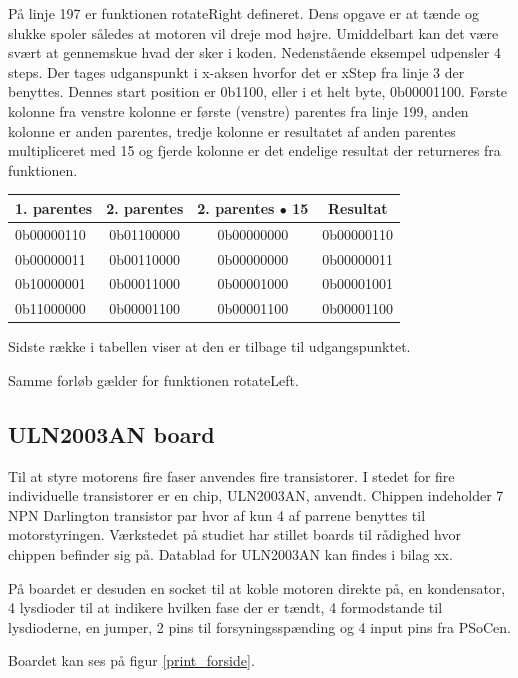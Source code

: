 På linje 197 er funktionen rotateRight defineret. Dens opgave er at tænde og slukke spoler således at motoren vil dreje mod højre. Umiddelbart kan det være svært at gennemskue hvad der sker i koden. Nedenstående eksempel udpensler 4 steps. Der tages udganspunkt i x-aksen hvorfor det er xStep fra linje 3 der benyttes. Dennes start position er 0b1100, eller i et helt byte, 0b00001100. Første kolonne fra venstre kolonne er første (venstre) parentes fra linje 199, anden kolonne er anden parentes, tredje kolonne er resultatet af anden parentes multipliceret med 15 og fjerde kolonne er det endelige resultat der returneres fra funktionen.

\begin{table}
\begin{tabular}{| l | c | c | c |}
\hline
1. parentes & 2. parentes & 2. parentes $\bullet$ 15 & Resultat\\\hline
0b00000110 & 0b01100000 & 0b00000000 & 0b00000110\\\hline
0b00000011 & 0b00110000 & 0b00000000 & 0b00000011\\\hline
0b10000001 & 0b00011000 & 0b00001000 & 0b00001001\\\hline
0b11000000 & 0b00001100 & 0b00001100 & 0b00001100\\\hline
\end{tabular}
\end{table}

Sidste række i tabellen viser at den er tilbage til udgangspunktet.

Samme forløb gælder for funktionen rotateLeft.

\subsection{ULN2003AN board}
Til at styre motorens fire faser anvendes fire transistorer. I stedet for fire individuelle transistorer er en chip, ULN2003AN, anvendt. Chippen indeholder 7 NPN Darlington transistor par hvor af kun 4 af parrene benyttes til motorstyringen. Værkstedet på studiet har stillet boards til rådighed hvor chippen befinder sig på. Datablad for ULN2003AN kan findes i bilag xx.

På boardet er desuden en socket til at koble motoren direkte på, en kondensator, 4 lysdioder til at indikere hvilken fase der er tændt, 4 formodstande til lysdioderne, en jumper, 2 pins til forsyningsspænding og 4 input pins fra PSoCen.

Boardet kan ses på figur \ref{print_forside}.

